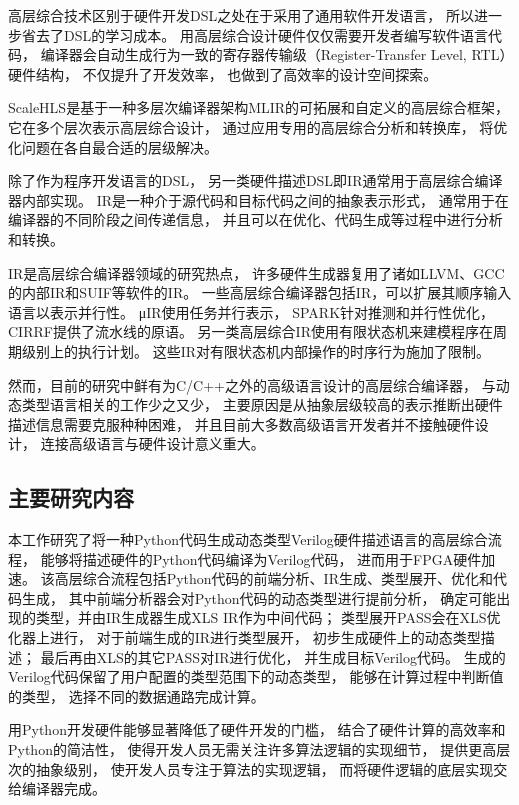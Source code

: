高层综合技术区别于硬件开发DSL之处在于采用了通用软件开发语言，
所以进一步省去了DSL的学习成本。
用高层综合设计硬件仅仅需要开发者编写软件语言代码，
编译器会自动生成行为一致的寄存器传输级（Register-Transfer Level, RTL）硬件结构，
不仅提升了开发效率，
也做到了高效率的设计空间探索。

ScaleHLS\cite{scalehls}是基于一种多层次编译器架构MLIR\cite{mlir}的可拓展和自定义的高层综合框架，
它在多个层次表示高层综合设计，
通过应用专用的高层综合分析和转换库，
将优化问题在各自最合适的层级解决。

除了作为程序开发语言的DSL，
另一类硬件描述DSL即IR通常用于高层综合编译器内部实现。
IR是一种介于源代码和目标代码之间的抽象表示形式，
通常用于在编译器的不同阶段之间传递信息，
并且可以在优化、代码生成等过程中进行分析和转换。

IR是高层综合编译器领域的研究热点，
许多硬件生成器复用了诸如LLVM、GCC的内部IR和SUIF等软件的IR。
一些高层综合编译器包括IR，可以扩展其顺序输入语言以表示并行性。
μIR\cite{muir}使用任务并行表示，
SPARK\cite{spark}针对推测和并行性优化，
CIRRF\cite{cirrf}提供了流水线的原语。
另一类高层综合IR使用有限状态机来建模程序在周期级别上的执行计划。
这些IR对有限状态机内部操作的时序行为施加了限制。

然而，目前的研究中鲜有为C/C++之外的高级语言设计的高层综合编译器，
与动态类型语言相关的工作少之又少，
主要原因是从抽象层级较高的表示推断出硬件描述信息需要克服种种困难，
并且目前大多数高级语言开发者并不接触硬件设计，
连接高级语言与硬件设计意义重大。

\subsection{主要研究内容}

本工作研究了将一种Python代码生成动态类型Verilog硬件描述语言的高层综合流程，
能够将描述硬件的Python代码编译为Verilog代码，
进而用于FPGA硬件加速。
该高层综合流程包括Python代码的前端分析、IR生成、类型展开、优化和代码生成，
其中前端分析器会对Python代码的动态类型进行提前分析，
确定可能出现的类型，并由IR生成器生成XLS IR作为中间代码；
类型展开PASS会在XLS优化器上进行，
对于前端生成的IR进行类型展开，
初步生成硬件上的动态类型描述；
最后再由XLS的其它PASS对IR进行优化，
并生成目标Verilog代码。
生成的Verilog代码保留了用户配置的类型范围下的动态类型，
能够在计算过程中判断值的类型，
选择不同的数据通路完成计算。

用Python开发硬件能够显著降低了硬件开发的门槛，
结合了硬件计算的高效率和Python的简洁性，
使得开发人员无需关注许多算法逻辑的实现细节，
提供更高层次的抽象级别，
使开发人员专注于算法的实现逻辑，
而将硬件逻辑的底层实现交给编译器完成。

